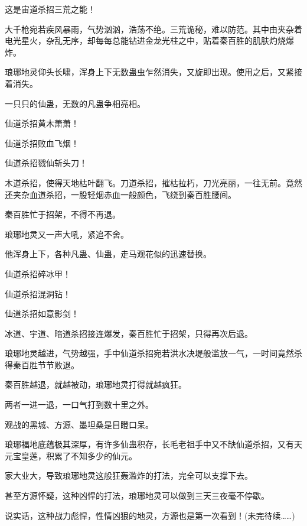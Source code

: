\begin{this_body}
这是宙道杀招三荒之能！

大千枪宛若疾风暴雨，气势汹汹，浩荡不绝。三荒诡秘，难以防范。其中由夹杂着电光星火，杂乱无序，却每每总能钻进金龙光柱之中，贴着秦百胜的肌肤灼烧爆炸。

琅琊地灵仰头长啸，浑身上下无数蛊虫乍然消失，又旋即出现。使用之后，又紧接着消失。

一只只的仙蛊，无数的凡蛊争相亮相。

仙道杀招黄木萧萧！

仙道杀招败血飞烟！

仙道杀招戮仙斩头刀！

木道杀招，使得天地枯叶翻飞。刀道杀招，摧枯拉朽，刀光亮丽，一往无前。竟然还夹杂血道杀招，一股轻烟赤血一般颜色，飞绕到秦百胜腰间。

秦百胜忙于招架，不得不再退。

琅琊地灵又一声大吼，紧追不舍。

他浑身上下，各种凡蛊、仙蛊，走马观花似的迅速替换。

仙道杀招碎冰甲！

仙道杀招混洞钻！

仙道杀招如意影剑！

冰道、宇道、暗道杀招接连爆发，秦百胜忙于招架，只得再次后退。

琅琊地灵越进，气势越强，手中仙道杀招宛若洪水决堤般滥放一气，一时间竟然杀得秦百胜节节败退。

秦百胜越退，就越被动，琅琊地灵打得就越疯狂。

两者一进一退，一口气打到数十里之外。

观战的黑城、方源、墨坦桑是目瞪口呆。

琅琊福地底蕴极其深厚，有许多仙蛊积存，长毛老祖手中又不缺仙道杀招，又有天元宝皇莲，积累了不知多少的仙元。

家大业大，导致琅琊地灵这般狂轰滥炸的打法，完全可以支撑下去。

甚至方源怀疑，这种凶悍的打法，琅琊地灵可以做到三天三夜毫不停歇。

说实话，这种战力彪悍，性情凶狠的地灵，方源也是第一次看到！(未完待续……)

\end{this_body}

